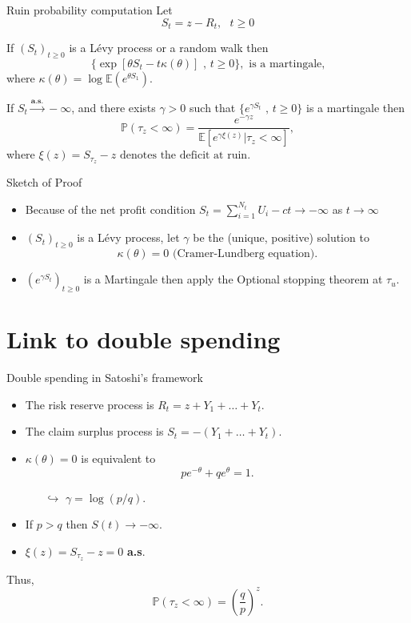 \documentclass{beamer}
\begin{document}
\begin{frame}{Ruin probability computation}
\scriptsize
Let 
$$
S_t = z - R_t,\text{ }t\geq0
$$
\begin{theorem}
If $(S_t)_{t\geq0}$ is a L\'evy process or a random walk then
$$
\{\exp\left[\theta S_t-t\kappa(\theta)\right]\text{ , }t\geq0\},\text{ is a martingale,}
$$
where $\kappa(\theta)=\log\mathbb{E}\left(e^{\theta S_1}\right)$.
\end{theorem}

\begin{theorem}
If $S_t\overset{\textbf{a.s.}}{\rightarrow} -\infty$, and there exists $\gamma>0$ such that $\{e^{\gamma S_t}\text{ , }t\geq0\}$ is a martingale then
$$
\mathbb{P}(\tau_z<\infty)=\frac{e^{-\gamma z}}{\mathbb{E}\left[e^{\gamma \xi(z)}|\tau_z<\infty\right]},
$$
where $\xi(z)=S_{\tau_z}-z\text{ denotes the deficit at ruin.}$
\end{theorem}
\end{frame}
\begin{frame}{Sketch of Proof}
\scriptsize
\begin{itemize}
\item Because of the net profit condition $S_t = \sum_{i=1}^{N_t}U_i-ct\rightarrow -\infty$ as $t\rightarrow\infty$
\item $(S_t)_{t\geq0}$ is a Lévy process, let $\gamma$ be the (unique, positive) solution to
$$
\kappa(\theta) = 0\text{ (Cramer-Lundberg equation)}.
$$
\item  $(e^{\gamma S_t})_{t\geq0}$ is a Martingale then apply the Optional stopping theorem at $\tau_u$.

\end{itemize}
\end{frame}
\section{Link to double spending}
\begin{frame}{Double spending in Satoshi's framework}
\begin{itemize}
\item The risk reserve process is $R_t=z+Y_1+\ldots+Y_t.$
\item The claim surplus process is $S_t=-(Y_1+\ldots+Y_t).$
\item $\kappa(\theta)=0$ is equivalent to
$$pe^{-\theta}+qe^{\theta}=1.$$
\begin{itemize}
\item[$\hookrightarrow$] $\gamma=\log(p/q).$
\end{itemize}
\item If $p>q$ then $S(t)\rightarrow - \infty$.
\item  $\xi(z)=S_{\tau_z}-z=0$ \textbf{a.s}.
\end{itemize}
Thus,
$$\mathbb{P}(\tau_z<\infty)=\left(\frac{q}{p}\right)^{z}.$$
\end{frame}
\end{document}
